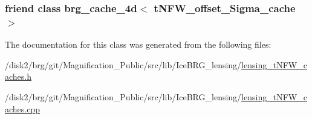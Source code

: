 \subsubsection[{brg\+\_\+cache\+\_\+4d$<$ t\+N\+F\+W\+\_\+offset\+\_\+\+Sigma\+\_\+cache $>$}]{\setlength{\rightskip}{0pt plus 5cm}friend class {\bf brg\+\_\+cache\+\_\+4d}$<$ {\bf t\+N\+F\+W\+\_\+offset\+\_\+\+Sigma\+\_\+cache} $>$\hspace{0.3cm}{\ttfamily [friend]}}\label{classIceBRG_1_1tNFW__offset__Sigma__cache_a070c97d6c85feabe82ca95b429759bbc}


The documentation for this class was generated from the following files\+:\begin{DoxyCompactItemize}
\item 
/disk2/brg/git/\+Magnification\+\_\+\+Public/src/lib/\+Ice\+B\+R\+G\+\_\+lensing/\hyperlink{lensing__tNFW__caches_8h}{lensing\+\_\+t\+N\+F\+W\+\_\+caches.\+h}\item 
/disk2/brg/git/\+Magnification\+\_\+\+Public/src/lib/\+Ice\+B\+R\+G\+\_\+lensing/\hyperlink{lensing__tNFW__caches_8cpp}{lensing\+\_\+t\+N\+F\+W\+\_\+caches.\+cpp}\end{DoxyCompactItemize}
